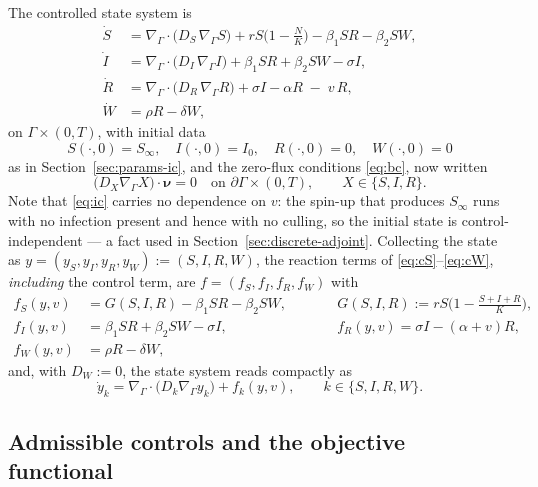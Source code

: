 \documentclass[11pt]{article}
\newcommand{\Grad}{\nabla_\Gamma}
\newcommand{\Div}{\nabla_\Gamma\cdot}
\begin{document}
The controlled state system is
\begin{align}
\dot S &= \Div\big(D_S\,\Grad S\big) + rS\Big(1-\frac{N}{K}\Big) - \beta_1 S R - \beta_2 S W, \label{eq:cS} \\
\dot I &= \Div\big(D_I\,\Grad I\big) + \beta_1 S R + \beta_2 S W - \sigma I, \label{eq:cI} \\
\dot R &= \Div\big(D_R\,\Grad R\big) + \sigma I - \alpha R \;-\; v\,R, \label{eq:cR} \\
\dot W &= \rho R - \delta W, \label{eq:cW}
\end{align}
on $\Gamma\times(0,T)$, with initial data
\begin{equation}
S(\cdot,0)=S_\infty,\quad I(\cdot,0)=I_0,\quad R(\cdot,0)=0,\quad W(\cdot,0)=0
\label{eq:ic}
\end{equation}
as in Section~\ref{sec:params-ic}, and the zero-flux conditions \eqref{eq:bc}, now written
\begin{equation}
\big(D_X\Grad X\big)\cdot\boldsymbol\nu = 0 \quad\text{on }\partial\Gamma\times(0,T), \qquad X\in\{S,I,R\}.
\label{eq:cbc}
\end{equation}
Note that \eqref{eq:ic} carries no dependence on $v$: the spin-up that produces $S_\infty$ runs with no infection present and hence with no culling, so the initial state is control-independent --- a fact used in Section~\ref{sec:discrete-adjoint}. Collecting the state as $y = (y_S,y_I,y_R,y_W) := (S,I,R,W)$, the reaction terms of \eqref{eq:cS}--\eqref{eq:cW}, \emph{including} the control term, are $f = (f_S,f_I,f_R,f_W)$ with
\begin{equation}
\begin{aligned}
f_S(y,v) &= G(S,I,R) - \beta_1 SR - \beta_2 SW, \qquad
&&G(S,I,R) := rS\Big(1-\frac{S+I+R}{K}\Big),\\
f_I(y,v) &= \beta_1 SR + \beta_2 SW - \sigma I, \qquad
&&f_R(y,v) = \sigma I - (\alpha+v) R,\\
f_W(y,v) &= \rho R - \delta W, &&
\end{aligned}
\label{eq:fdef}
\end{equation}
and, with $D_W := 0$, the state system reads compactly as
\begin{equation}
\dot y_k = \Div\big(D_k\Grad y_k\big) + f_k(y,v), \qquad k\in\{S,I,R,W\}.
\label{eq:state-compact}
\end{equation}

\subsection{Admissible controls and the objective functional}
\end{document}
